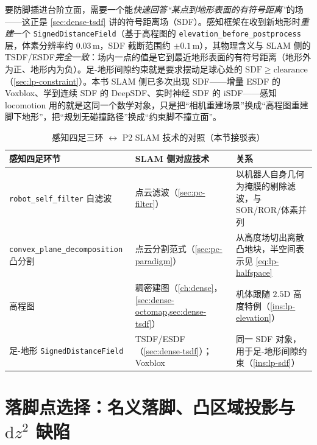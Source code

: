 \begin{insight}[足-地形碰撞 = 在地形 SDF 上查间隙，接 P2 的 TSDF/ESDF]\label{ins:lp-sdf}
要防脚插进台阶立面，需要一个能\emph{快速回答“某点到地形表面的有符号距离”}的场——这正是 \cref{sec:dense-tsdf} 讲的符号距离场（SDF）。感知框架在收到新地形时\emph{重建}一个 \texttt{SignedDistanceField}（基于高程图的 \texttt{elevation\_before\_postprocess} 层，体素分辨率约 $0.03\,$m，SDF 截断范围约 $\pm 0.1\,$m），其物理含义与 SLAM 侧的 TSDF/ESDF\emph{完全一致}：场内一点的值是它到最近地形表面的有符号距离（地形外为正、地形内为负）。足-地形间隙约束就是要求摆动足球心处的 $\mathrm{SDF}\ge \text{clearance}$（\cref{sec:lp-constraint}）。本书 SLAM 侧已多次出现 SDF——增量 ESDF 的 Voxblox\cite{oleynikova2017voxblox}、学到连续 SDF 的 DeepSDF\cite{park2019deepsdf}、实时神经 SDF 的 iSDF\cite{ortiz2022isdf}——感知 locomotion 用的就是这同一个数学对象，只是把“相机重建场景”换成“高程图重建脚下地形”，把“规划无碰撞路径”换成“约束脚不撞立面”。
\end{insight}

\begin{table}[H]\centering\small
\caption{感知四足三环 $\leftrightarrow$ P2 SLAM 技术的对照（本节接驳表）}
\begin{tabular}{p{} p{} p{}}
\toprule
感知四足环节 & SLAM 侧对应技术 & 关系 \\
\midrule
\texttt{robot\_self\_filter} 自滤波 & 点云滤波（\cref{sec:pc-filter}）& 以机器人自身几何为掩膜的剔除滤波，与 SOR/ROR/体素并列 \\
\texttt{convex\_plane\_decomposition} 凸分割 & 点云分割范式（\cref{sec:pc-paradigm}）& 从高度场切出离散凸地块，半空间表示见 \cref{eq:lp-halfspace} \\
高程图 & 稠密建图（\cref{ch:dense}，\cref{sec:dense-octomap,sec:dense-tsdf}）& 机体跟随 $2.5$D 高度特例（\cref{ins:lp-elevation}）\\
足-地形 \texttt{SignedDistanceField} & TSDF/ESDF（\cref{sec:dense-tsdf}）；Voxblox\cite{oleynikova2017voxblox} & 同一 SDF 对象，用于足-地形间隙约束（\cref{ins:lp-sdf}）\\
\bottomrule
\end{tabular}
\label{tab:lp-slam}
\end{table}

\section{落脚点选择：名义落脚、凸区域投影与 \texorpdfstring{$\mathrm{d}z^2$}{dz2} 缺陷}
\label{sec:lp-foothold}

